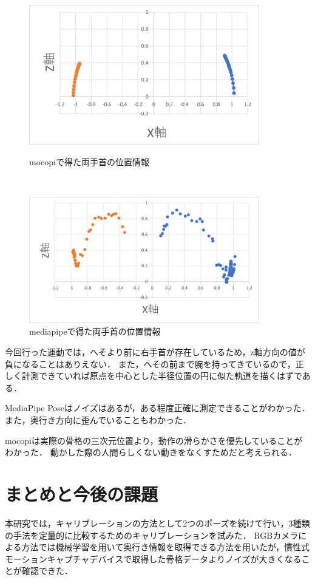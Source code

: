 \documentclass[a4j, fleqn, 12pt]{jsreport}
\begin{document}
\begin{figure}[h]
    \centering
    \begin{minipage}{10cm}
        \centering
        \includegraphics[width=10cm]{img/1_mocopi.png}
        \caption{mocopiで得た両手首の位置情報}
        \label{fig:1_mocopi}
    \end{minipage}\\
    \begin{minipage}{10cm}
        \centering
        \includegraphics[width=10cm]{img/1_media.png}
        \caption{mediapipeで得た両手首の位置情報}
        \label{fig:1_media}
    \end{minipage}
\end{figure}
今回行った運動では，へそより前に右手首が存在しているため，z軸方向の値が負になることはありえない．
また，へその前まで腕を持ってきているので，正しく計測できていれば原点を中心とした半径位置の円に似た軌道を描くはずである．

MediaPipe Poseはノイズはあるが，ある程度正確に測定できることがわかった．
また，奥行き方向に歪んでいることもわかった．

mocopiは実際の骨格の三次元位置より，動作の滑らかさを優先していることがわかった．
動かした際の人間らしくない動きをなくすためだと考えられる．

\chapter{まとめと今後の課題}
本研究では，キャリブレーションの方法として2つのポーズを続けて行い，3種類の手法を定量的に比較するためのキャリブレーションを試みた．
RGBカメラによる方法では機械学習を用いて奥行き情報を取得できる方法を用いたが，慣性式モーションキャプチャデバイスで取得した骨格データよりノイズが大きくなることが確認できた．
\end{document}
